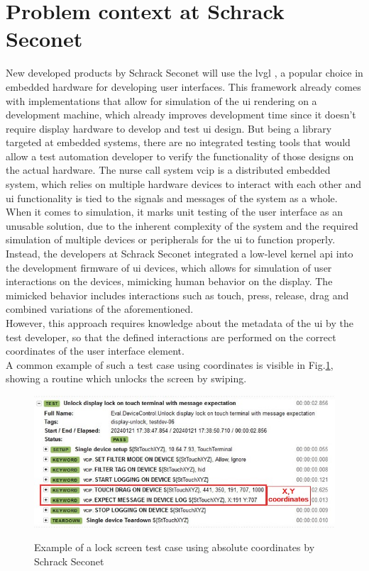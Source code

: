 \documentclass[Bachelor, BIC, english, fhCitStyle, IEEE]{BASE/twbook} %
\begin{document}
\section{Problem context at Schrack Seconet}
New developed products by Schrack Seconet will use the \acf{lvgl} \autocite{LVGLLightVersatile}, a popular choice in embedded hardware for developing user interfaces. This framework already comes with implementations that allow for simulation of the \ac{ui} rendering on a development machine, which already improves development time since it doesn't require display hardware to develop and test \ac{ui} design.
But being a library targeted at embedded systems, there are no integrated testing tools that would allow a test automation developer to verify the functionality of those designs on the actual hardware. The nurse call system \ac{vcip} \autocite{VisocallIPModerne} is a distributed embedded system, which relies on multiple hardware devices to interact with each other and \ac{ui} functionality is tied to the signals and messages of the system as a whole.
When it comes to simulation, it marks unit testing of the user interface as an unusable solution, due to the inherent complexity of the system and the required simulation of multiple devices or peripherals for the \ac{ui} to function properly.\\
Instead, the developers at Schrack Seconet integrated a low-level kernel \ac{api} into the development firmware of \ac{ui} devices, which allows for simulation of user interactions on the devices, mimicking human behavior on the display. The mimicked behavior includes interactions such as touch, press, release, drag and combined variations of the aforementioned.\\
However, this approach requires knowledge about the metadata of the \ac{ui} by the test developer, so that the defined interactions are performed on the correct coordinates of the user interface element.\\
A common example of such a test case using coordinates is visible in Fig.\ref{fig:lock-screen-test-example}, showing a routine which unlocks the screen by swiping.
\begin{figure}[H]
    \caption{Example of a lock screen test case using absolute coordinates by Schrack Seconet}
    \centering
    \includegraphics[width=\textwidth]{lock-screen-testcase.jpg}
    \label{fig:lock-screen-test-example}
\end{figure}
\end{document}
